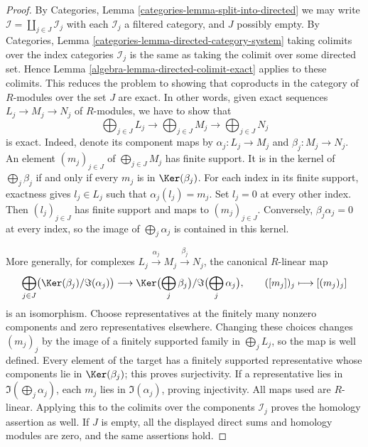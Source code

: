 \begin{proof}
By
Categories, Lemma \ref{categories-lemma-split-into-directed}
we may write $\mathcal{I} = \coprod_{j \in J} \mathcal{I}_j$ with each
$\mathcal{I}_j$ a filtered category, and $J$ possibly empty. By
Categories, Lemma \ref{categories-lemma-directed-category-system}
taking colimits over the index categories $\mathcal{I}_j$ is
the same as taking the colimit over some directed set. Hence
Lemma \ref{algebra-lemma-directed-colimit-exact}
applies to these colimits. This reduces the problem to showing that
coproducts in the category of $R$-modules over the set $J$ are exact.
In other words, given exact sequences
$L_j \to M_j \to N_j$ of $R$-modules, we have to show that
$$
\bigoplus\nolimits_{j \in J} L_j
\longrightarrow
\bigoplus\nolimits_{j \in J} M_j
\longrightarrow
\bigoplus\nolimits_{j \in J} N_j
$$
is exact. Indeed, denote its component maps by
$\alpha_j : L_j \to M_j$ and $\beta_j : M_j \to N_j$.
An element $(m_j)_{j \in J}$ of $\bigoplus_{j \in J} M_j$
has finite support. It is in the kernel of $\bigoplus_j\beta_j$
if and only if every $m_j$ is in $\Ker(\beta_j)$.
For each index in its finite support, exactness gives
$l_j \in L_j$ such that $\alpha_j(l_j) = m_j$.
Set $l_j = 0$ at every other index. Then $(l_j)_{j \in J}$
has finite support and maps to $(m_j)_{j \in J}$.
Conversely, $\beta_j\alpha_j = 0$ at every index, so the image
of $\bigoplus_j\alpha_j$ is contained in this kernel.

\medskip\noindent
More generally, for complexes $L_j \xrightarrow{\alpha_j} M_j
\xrightarrow{\beta_j} N_j$, the canonical $R$-linear map
$$
\bigoplus_{j \in J}
\bigl(\Ker(\beta_j)/\Im(\alpha_j)\bigr)
\longrightarrow
\Ker\bigl(\bigoplus_j\beta_j\bigr)
/\Im\bigl(\bigoplus_j\alpha_j\bigr),
\qquad ([m_j])_j \longmapsto [(m_j)_j]
$$
is an isomorphism. Choose representatives at the finitely many
nonzero components and zero representatives elsewhere. Changing these
choices changes $(m_j)_j$ by the image of a finitely supported
family in $\bigoplus_j L_j$, so the map is well defined.
Every element of the target has a finitely supported representative
whose components lie in $\Ker(\beta_j)$; this proves surjectivity.
If a representative lies in $\Im(\bigoplus_j\alpha_j)$, each
$m_j$ lies in $\Im(\alpha_j)$, proving injectivity.
All maps used are $R$-linear. Applying this to the colimits over
the components $\mathcal{I}_j$ proves the homology assertion as well.
If $J$ is empty, all the displayed direct sums and homology modules
are zero, and the same assertions hold.
\end{proof}


